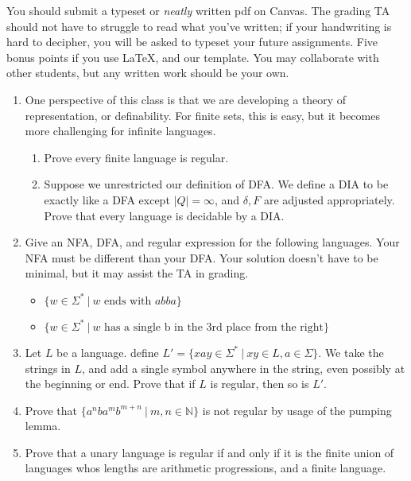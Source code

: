 \documentclass[11pt]{article}
\begin{document}

You should submit a typeset or \emph{neatly} written pdf on Canvas.  The grading TA should not have to struggle to read what you've written; if your handwriting is hard to decipher, you will be asked to typeset your future assignments. Five bonus points if you use \LaTeX, and our template. You may collaborate with other students, but any written work should be your own. 


\begin{enumerate}

    \item 
    
    One perspective of this class is that we are developing a theory of representation, or definability. For finite sets, this is easy, but it becomes more challenging for infinite languages. 

    \begin{enumerate}
        \item Prove every finite language is regular.
        \item Suppose we unrestricted our definition of DFA. We define a DIA to be exactly like a DFA except $|Q|=\infty$, and $\delta, F$ are adjusted appropriately. Prove that every language is decidable by a DIA.
    \end{enumerate}
    
    \item Give an NFA, DFA, and regular expression for the following languages. Your NFA must be different than your DFA. Your solution doesn't have to be minimal, but it may assist the TA in grading. 
    \begin{itemize}
        \item $\{w \in \Sigma^* ~|~ w\text{ ends with } abba\}$
        \item $\{w \in \Sigma^* ~|~ w\text{ has a single b in the 3rd place from the right}\}$
    \end{itemize}
    
    \item Let $L$ be a language. define $L' = \{xay \in \Sigma^*~|~ xy \in L, a \in \Sigma\}$. We take the strings in $L$, and add a single symbol anywhere in the string, even possibly at the beginning or end. Prove that if $L$ is regular, then so is $L'$.

    \item Prove that $\{a^nba^mb^{m+n} ~|~ m,n \in \mathbb{N}\}$ is not regular by usage of the pumping lemma.
    
    \item Prove that a unary language is regular if and only if it is the finite union of languages whos lengths are arithmetic progressions, and a finite language.
\end{enumerate}
\end{document}
